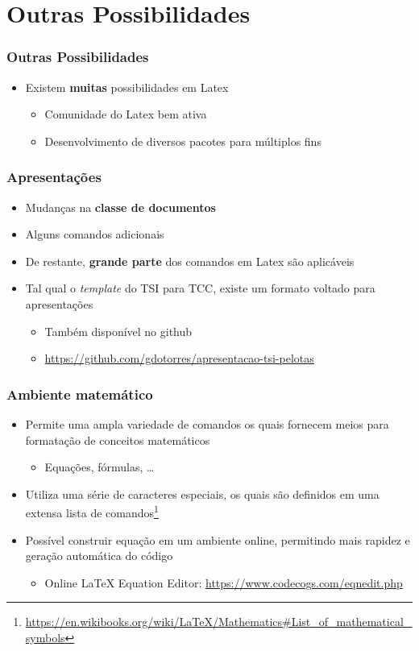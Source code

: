 \section{Outras Possibilidades}

\begin{frame}[fragile] \frametitle{Outras Possibilidades}
\begin{itemize}
	\item Existem \textbf{muitas} possibilidades em Latex
	\begin{itemize}
		\item Comunidade do Latex bem ativa
		\item Desenvolvimento de diversos pacotes para múltiplos fins
	\end{itemize}
\end{itemize}
\end{frame}

\begin{frame}[fragile] \frametitle{Apresentações}
\begin{itemize}
	\item Mudanças na \textbf{classe de documentos}
	\item Alguns comandos adicionais
	\item De restante, \textbf{grande parte} dos comandos em Latex são aplicáveis
	\item Tal qual o \textit{template} do TSI para TCC, existe um formato voltado para apresentações
	\begin{itemize}
		\item Também disponível no github
		\item \url{https://github.com/gdotorres/apresentacao-tsi-pelotas}
	\end{itemize}
\end{itemize}
\end{frame}

\begin{frame}[fragile] \frametitle{Ambiente matemático}
\begin{itemize}
	\item Permite uma ampla variedade de comandos os quais fornecem meios para formatação de conceitos matemáticos
	\begin{itemize}
		\item Equações, fórmulas, \ldots
	\end{itemize}
	\item Utiliza uma série de caracteres especiais, os quais são definidos em uma extensa lista de comandos\footnote{\url{https://en.wikibooks.org/wiki/LaTeX/Mathematics\#List\_of\_mathematical\_symbols}}
	\item Possível construir equação em um ambiente online, permitindo mais rapidez e geração automática do código
	\begin{itemize}
		\item Online LaTeX Equation Editor: \url{https://www.codecogs.com/eqnedit.php}
	\end{itemize}
\end{itemize}
\end{frame}

